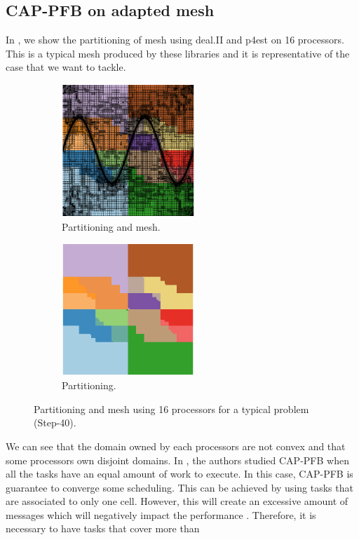 \documentclass[letterpaper]{article}
\renewcommand{\(}{\left(}
\renewcommand{\)}{\right)}
\renewcommand{\[}{\left[}
\renewcommand{\]}{\right]}
\begin{document}
\subsection{CAP-PFB on adapted mesh}
In , we show the partitioning of mesh using deal.II and p4est 
on 16 processors. This is a typical mesh produced by these libraries and it is
representative of the case that we want to tackle. 
\begin{figure}[H]
  \begin{subfigure}[b]{.5\textwidth}
    \centering
    \includegraphics[width=5cm]{subdomain_id_0}
    \caption{Partitioning and mesh.}
  \end{subfigure}
  \begin{subfigure}[b]{.5\textwidth}
    \centering
    \includegraphics[width=5cm]{subdomain_id_1}
    \caption{Partitioning.}
  \end{subfigure}
  \caption{Partitioning and mesh using 16 processors for a typical problem
  (Step-40).}
  \label{subdomain_id}
\end{figure}
We can see that the domain owned by each processors are not convex and that some
processors own disjoint domains. In \cite{Mo2014}, the authors studied CAP-PFB
when all the tasks have an equal amount of work to execute. In this case,
CAP-PFB is guarantee to converge some scheduling. This can be achieved by using
tasks that are associated to only one cell. However, this will create an
excessive amount of messages which will negatively impact the performance
\cite{Pautz2002}. Therefore, it is necessary to have tasks that cover more than
\end{document}
